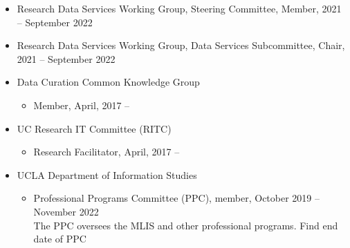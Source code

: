 \begin{itemize}[label={},leftmargin=!,labelindent=5pt,itemindent=-15pt]
  \item Research Data Services Working Group, Steering Committee, Member,  2021 -- September 2022
  \item Research Data Services Working Group, Data Services Subcommittee, Chair,  2021 -- September 2022
  \item Data Curation Common Knowledge Group
  \begin{itemize}
    \item Member, April, 2017 --
  \end{itemize}
  \item UC Research IT Committee (RITC)
    \begin{itemize}[label={},leftmargin=!,labelindent=5pt,itemindent=-15pt]
      \item Research Facilitator, April, 2017 --
    \end{itemize}
  \item UCLA Department of Information Studies
    \begin{itemize}[label={},leftmargin=!,labelindent=5pt,itemindent=-15pt]
      \item Professional Programs Committee (PPC), member, October 2019 -- November 2022  \\ The PPC oversees the MLIS and other professional programs.
      \todo Find end date of PPC 
    \end{itemize}
\end{itemize}
